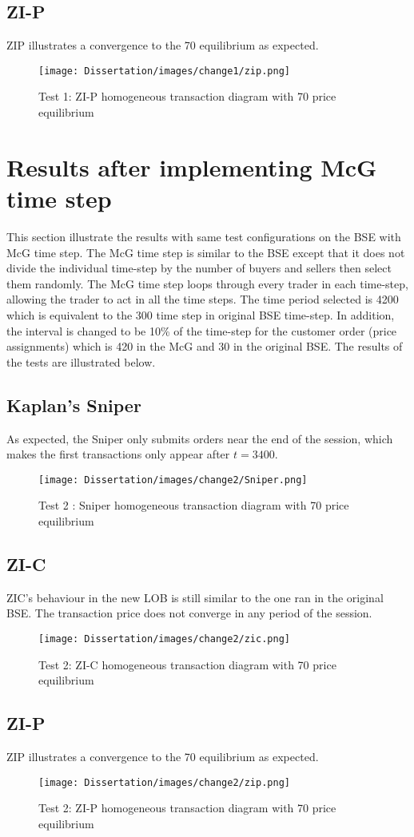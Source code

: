 \subsection{ZI-P}
ZIP illustrates a convergence to the 70 equilibrium as expected. 

\begin{figure}[h]
\caption{Test 1: ZI-P homogeneous transaction diagram with 70 price equilibrium} 
\texttt{[image: Dissertation/images/change1/zip.png]}
\end{figure} 
\FloatBarrier

\section{Results after implementing McG time step} 
This section illustrate the results with same test configurations on the BSE with McG time step. The McG time step is similar to the BSE except that it does not divide the individual time-step by the number of buyers and sellers then select them randomly. The McG time step loops through every trader in each time-step, allowing the trader to act in all the time steps. The time period selected is 4200 which is equivalent to the 300 time step in original BSE time-step. In addition, the interval is changed to be 10\% of the time-step for the customer order (price assignments) which is 420 in the McG and 30 in the original BSE. The results of the tests are illustrated below. 

\subsection{Kaplan's Sniper}
As expected, the Sniper only submits orders near the end of the session, which makes the first transactions only appear after $t = 3400$.  
\begin{figure}[h]
\caption{Test 2 : Sniper homogeneous transaction diagram with 70 price equilibrium} 
\texttt{[image: Dissertation/images/change2/Sniper.png]}
\end{figure} 
\FloatBarrier

\subsection{ZI-C}
ZIC's behaviour in the new LOB is still similar to the one ran in the original BSE. The transaction price does not converge in any period of the session. 
\begin{figure}[h]
\caption{Test 2: ZI-C homogeneous transaction diagram with 70 price equilibrium} 
\texttt{[image: Dissertation/images/change2/zic.png]}
\end{figure} 
\FloatBarrier

\subsection{ZI-P}
ZIP illustrates a convergence to the 70 equilibrium as expected. 

\begin{figure}[h]
\caption{Test 2: ZI-P homogeneous transaction diagram with 70 price equilibrium} 
\texttt{[image: Dissertation/images/change2/zip.png]}
\end{figure} 
\FloatBarrier
